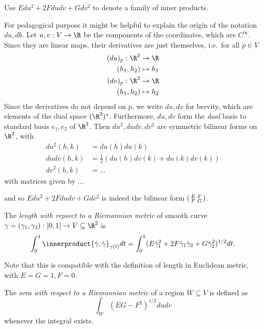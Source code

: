 \documentclass[a4paper]{article}
\theoremstyle{definition}
\newcommand*{\inner}{\innerproduct}
\begin{document}
\begin{notation}
  Use \(E du^2 + 2F dudv + G dv^2\) to denote a family of inner products.

  For pedagogical purpose it might be helpful to explain the origin of the notation \(du, db\). Let \(u, v: V \to \R\) be the components of the coordinates, which are \(C^\infty\). Since they are linear maps, their derivatives are just themselves, i.e.\ for all \(p \in V\)
  \begin{align*}
    (du)_p: \R^2 &\to \R \\
    (h_1, h_2) &\mapsto h_1 \\
    (dv)_p: \R^2 &\to \R \\
    (h_1, h_2) &\mapsto h_2
  \end{align*}
  Since the derivatives do not depend on \(p\), we write \(du, dv\) for brevity, which are elements of the dual space \((\R^2)^*\). Furthermore, \(du, dv\) form the \emph{dual} basis to standard basis \(e_1, e_2\) of \(\R^2\). Then \(du^2, dudv, dv^2\) are symmetric bilinear forms on \(\R^2\), with
  \begin{align*}
    du^2(h, k) &= du(h) du(k) \\
    dudv(h, k) &= \frac{1}{2}(du(h)dv(k) + du(k)dv(k)) \\
    dv^2(h, k) &= \dots
  \end{align*}
  with matrices given by ...

  and so \(Edu^2 + 2Fdudv + Gdv^2\) is indeed the bilinear form \(\begin{psmallmatrix} E & F \\ F & G \end{psmallmatrix}\).
\end{notation}

\begin{definition}[Length]
  The \emph{length with repsect to a Riemannian metric} of smooth curve \(\gamma = (\gamma_1, \gamma_2): [0, 1] \to V \subseteq \R^2\) is
  \[
    \int_0^1 \inner{\dot \gamma, \dot \gamma}_{\gamma(t)}dt = \int_0^1 (E \dot \gamma_1^2 + 2F \dot \gamma_1 \dot \gamma_2 + G \dot \gamma_2^2)^{1/2} dt.
  \]
\end{definition}

Note that this is compatible with the definition of length in Euclidean metric, with \(E = G = 1, F = 0\).

\begin{definition}
  The \emph{area with respect to a Riemannian metric} of a region \(W \subseteq V\) is defined as
  \[
    \int_W (EG - F^2)^{1/2} dudv
  \]
  whenever the integral exists.
\end{definition}
\end{document}
